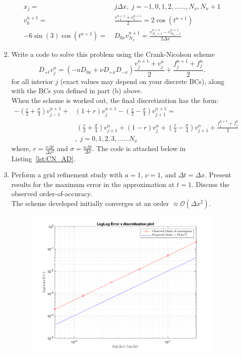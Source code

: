 \documentclass[11pt]{article}
\newcommand{\Dpt}{D_{+t}}
\newcommand{\Dpx}{D_{+x}}
\newcommand{\Dmx}{D_{-x}}
\newcommand{\Dzx}{D_{0x}}
\newcommand{\dx}{\Delta x}
\newcommand{\dt}{\Delta t}
\newcommand{\vnpjm}{v^{n+1}_{j-1}}
\newcommand{\vnpjp}{v^{n+1}_{j+1}}
\newcommand{\vnpj}{v^{n+1}_{j}}
\newcommand{\vnjp}{v^{n}_{j+1}}
\newcommand{\vnj}{v^{n}_{j}}
\newcommand{\bra}[1]{\left(#1\right)}
\begin{document}
\begin{enumerate}
\begin{enumerate}
      \begin{align*}
      x_j =& \ j\Delta x, \; j = -1,0,1,2,\ldots \ldots, N_x, N_x +1 \\
      v^{n+1}_0 =&\ \frac{v^{n+1}_{-1} + v^{n+1}_1}{2} = 2\cos(t^{n+1})\\
      -6\sin(3)\cos(t^{n+1}) =& \ \Dzx v^{n+1}_{N_x} = \frac{v^{n+1}_{N_x + 1}-v^{n+1}_{N_x - 1}}{2\dx}
      \end{align*}
      \item {\color{red}Write a code to solve this problem using the Crank-Nicolson scheme}
        \[
          \Dpt v_j^n = \left(-a\Dzx+\nu \Dpx\Dmx\right)\frac{v_j^{n+1}+v_j^n}{2}+\frac{f_j^{n+1}+f_j^n}{2}.
        \]
        {\color{red}for all interior $j$ (exact values may depend on your discrete BCs), along with the BCs you defined in part (b) above.}\\
        When the scheme is worked out, the final discretization has the form:
        \begin{align*}
        -\bra{\frac{r}{2} + \frac{\sigma}{4}}\vnpjm + &\bra{1+r}\vnpj -\bra{\frac{r}{2} - \frac{\sigma}{4}}\vnpjp = \\
        & \ \bra{\frac{r}{2} + \frac{\sigma}{4}}\vnjp + \bra{1-r}\vnj + \bra{\frac{r}{2} - \frac{\sigma}{4}}\vnjp +\frac{f^{n+1}_j + f^n_j}{2} \\
        & , \; j=0,1,2,3,\ldots \ldots N_x 
        \end{align*}
        where, $r=\frac{\nu\dt}{\dx^2}$ and $\sigma = \frac{a\dt}{\dx}$. The code is attached below in Listing~\ref{lst:CN_AD}.
        
      \item {\color{red}Perform a grid refinement study with $a=1$, $\nu=1$, and $\Delta t = \Delta x$. Present results for the maximum error in the approximation at $t=1$. Discuss the observed order-of-accuracy.} \\
      The scheme developed initially converges at an order $\approx \mathcal{O}(\dx^2)$.
      \begin{figure}[htp]
      \centering
      \includegraphics[width=5in]{ErrPlotQ1.png}

\end{figure}
\end{enumerate}
\end{enumerate}
\end{document}
